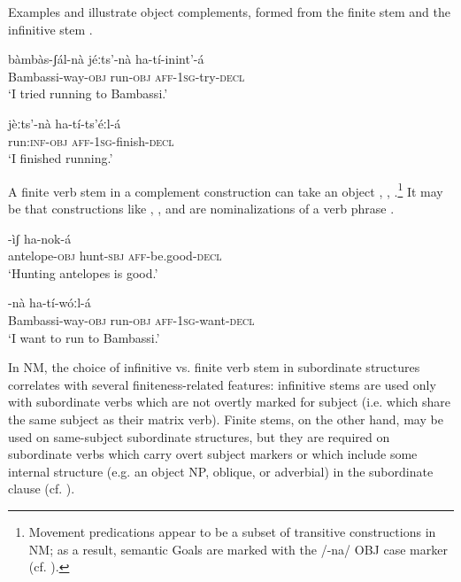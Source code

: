 \documentclass[output=paper]{langsci/langscibook}
\begin{document}
Examples  and  illustrate object complements, formed from the finite stem  and the infinitive stem . 

\ea\label{ex:mahland:36}
\gll bàmbàs-ʃál-nà            jéːts'-nà    ha-tí-inint'-{\downstep}á\\
Bambassi-way-\textsc{obj}    run\textsc{{}-obj}     \textsc{aff-1sg}{}-try\textsc{{}-decl} \\
\glt `I tried running to Bambassi.'
\z

\ea\label{ex:mahland:37}
\gll jèːts'-nà        ha-tí-ts'éːl-{\downstep}á\\
run:\textsc{inf-obj}   \textsc{aff-1sg}{}-finish-\textsc{decl} \\
\glt `I finished running.'
\z

A finite verb stem in a complement construction can take an object , , .\footnote{Movement predications appear to be a subset of transitive constructions in NM; as a result, semantic Goals are marked with the /-na/ OBJ case marker (cf. \citealt[335-339]{Ahland2012}).} It may be that constructions like , , and  are nominalizations of a verb phrase \citep[625]{Ahland2012}.

\ea\label{ex:mahland:38}
-ìʃ     ha-nok-á \\
antelope\textsc{{}-obj}    hunt\textsc{{}-sbj}       \textsc{aff}-be.good\textsc{{}-decl} \\
\glt `Hunting antelopes is good.'
\z

\ea\label{ex:mahland:39}
-nà    ha-tí-wóːl-{\downstep}á\\
{\db}Bambassi-way\textsc{{}-obj}     run\textsc{{}-obj}      \textsc{aff-1sg}{}-want\textsc{{}-decl} \\
\glt `I want to run to Bambassi.'
\z

In NM, the choice of infinitive vs. finite verb stem in subordinate structures correlates with several finiteness-related features: infinitive stems are used only with subordinate verbs which are not overtly marked for subject (i.e. which share the same subject as their matrix verb). Finite stems, on the other hand, may be used on same-subject subordinate structures, but they are required on subordinate verbs which carry overt subject markers or which include some internal structure (e.g. an object NP, oblique, or adverbial) in the subordinate clause (cf. \citealt[612, 630]{Ahland:2012}). 
\end{document}
